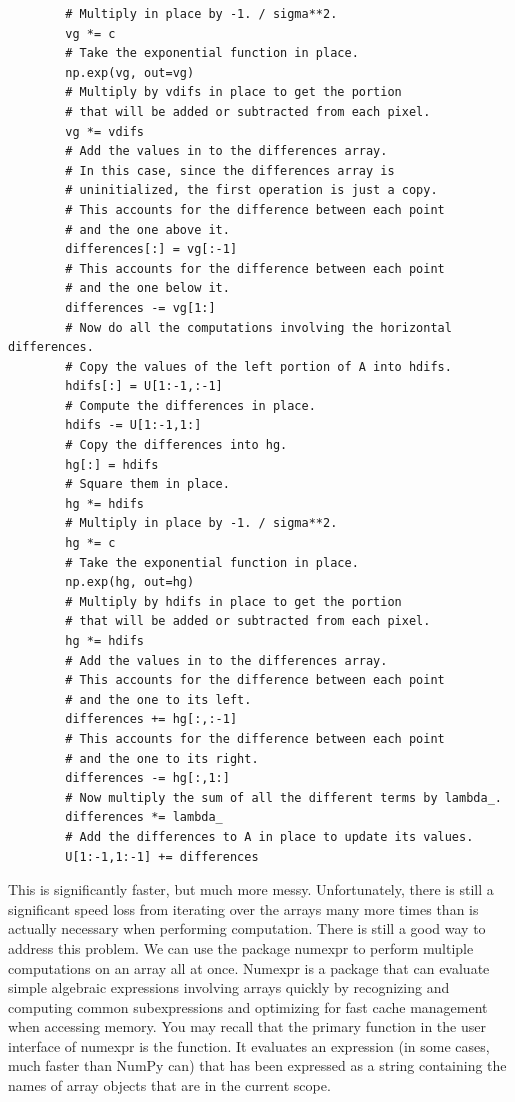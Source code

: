 \begin{lstlisting}
        # Multiply in place by -1. / sigma**2.
        vg *= c
        # Take the exponential function in place.
        np.exp(vg, out=vg)
        # Multiply by vdifs in place to get the portion
        # that will be added or subtracted from each pixel.
        vg *= vdifs
        # Add the values in to the differences array.
        # In this case, since the differences array is
        # uninitialized, the first operation is just a copy.
        # This accounts for the difference between each point
        # and the one above it.
        differences[:] = vg[:-1]
        # This accounts for the difference between each point
        # and the one below it.
        differences -= vg[1:]
        # Now do all the computations involving the horizontal differences.
        # Copy the values of the left portion of A into hdifs.
        hdifs[:] = U[1:-1,:-1]
        # Compute the differences in place.
        hdifs -= U[1:-1,1:]
        # Copy the differences into hg.
        hg[:] = hdifs
        # Square them in place.
        hg *= hdifs
        # Multiply in place by -1. / sigma**2.
        hg *= c
        # Take the exponential function in place.
        np.exp(hg, out=hg)
        # Multiply by hdifs in place to get the portion
        # that will be added or subtracted from each pixel.
        hg *= hdifs
        # Add the values in to the differences array.
        # This accounts for the difference between each point
        # and the one to its left.
        differences += hg[:,:-1]
        # This accounts for the difference between each point
        # and the one to its right.
        differences -= hg[:,1:]
        # Now multiply the sum of all the different terms by lambda_.
        differences *= lambda_
        # Add the differences to A in place to update its values.
        U[1:-1,1:-1] += differences
\end{lstlisting}
This is significantly faster, but much more messy.
Unfortunately, there is still a significant speed loss from iterating over the arrays many more times than is actually necessary when performing computation.
There is still a good way to address this problem.
We can use the package numexpr to perform multiple computations on an array all at once.
Numexpr is a package that can evaluate simple algebraic expressions involving arrays quickly by recognizing and computing common subexpressions and optimizing for fast cache management when accessing memory.
You may recall that the primary function in the user interface of numexpr is the  function.
It evaluates an expression (in some cases, much faster than NumPy can) that has been expressed as a string containing the names of array objects that are in the current scope.
